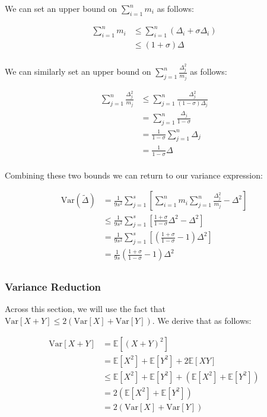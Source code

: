 \documentclass[11pt]{article}
\begin{document}
We can set an upper bound on $\sum_{i = 1}^{n}m_i$ as follows:

\[
\begin{aligned}
\sum_{i = 1}^{n}m_i &\leq \sum_{i = 1}^{n}(\Delta_i + \sigma \Delta_i) \\
&\leq (1 + \sigma) \Delta \\
\end{aligned}
\]

We can similarly set an upper bound on $\sum_{j = 1}^{n}\frac{\Delta_j^2}{m_j}$ as follows:

\[
\begin{aligned}
\sum_{j = 1}^{n}\frac{\Delta_j^2}{m_j} &\leq \sum_{j = 1}^{n}\frac{\Delta_j^2}{(1 - \sigma) \Delta_j} \\
&= \sum_{j = 1}^{n}\frac{\Delta_j}{1 - \sigma} \\
&= \frac{1}{1 - \sigma} \sum_{j = 1}^{n}\Delta_j \\
&= \frac{1}{1 - \sigma} \Delta \\
\end{aligned}
\]

Combining these two bounds we can return to our variance expression:

\[
\begin{aligned}
\mathrm{Var}(\tilde{\Delta}) &= \frac{1}{9s^2} \sum_{j = 1}^{s} [\sum_{i = 1}^{n}m_i \sum_{j = 1}^{n}\frac{\Delta_j^2}{m_j} - \Delta^2] \\
&\leq \frac{1}{9s^2} \sum_{j = 1}^{s} [\frac{1 + \sigma}{1 - \sigma} \Delta^2 - \Delta^2] \\
&= \frac{1}{9s^2} \sum_{j = 1}^{s} [(\frac{1 + \sigma}{1 - \sigma} - 1) \Delta^2] \\
&= \frac{1}{9s} (\frac{1 + \sigma}{1 - \sigma} - 1) \Delta^2 \\
\end{aligned}
\]

\subsubsection{Variance Reduction}

Across this section, we will use the fact that $\mathrm{Var}[X+Y] \leq 2(\mathrm{Var}[X] + \mathrm{Var}[Y])$. We derive that as follows:

\[
\begin{aligned}
    \mathrm{Var}[X+Y] &= \mathbb{E}[(X+Y)^2] \\
    &= \mathbb{E}[X^2] + \mathbb{E}[Y^2] + 2\mathbb{E}[XY] \\
    &\leq \mathbb{E}[X^2] + \mathbb{E}[Y^2] + (\mathbb{E}[X^2] + \mathbb{E}[Y^2]) \\
    &= 2(\mathbb{E}[X^2] + \mathbb{E}[Y^2]) \\
    &= 2(\mathrm{Var}[X] + \mathrm{Var}[Y])
\end{aligned}
\]
\end{document}
